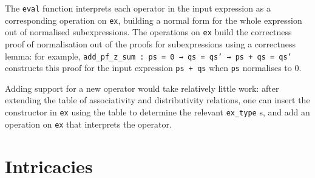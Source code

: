 \documentclass{llncs}
\newcommand{\lean}[1]{\texttt{#1}\xspace} %
\newcommand{\ex}{\lean{ex}}
\newcommand{\ring}{\lean{ring}}
\newcommand{\ringexp}{\lean{ring\_exp}}
\begin{document}
The \lean{eval} function interprets each operator in the input expression as a corresponding operation on \ex,
building a normal form for the whole expression out of normalised subexpressions.
The operations on \ex build the correctness proof of normalisation out of the proofs for subexpressions
using a correctness lemma: for example, \lean{add\_pf\_z\_sum : ps = 0 → qs = qs' → ps + qs = qs'} constructs this proof for the input expression \lean{ps + qs} when \lean{ps} normalises to $0$.

Adding support for a new operator would take relatively little work:
after extending the table of associativity and distributivity relations,
one can insert the constructor in \ex using the table to determine the relevant \lean{ex\_type}s,
and add an operation on \ex that interprets the operator.


\section{Intricacies}
\end{document}

